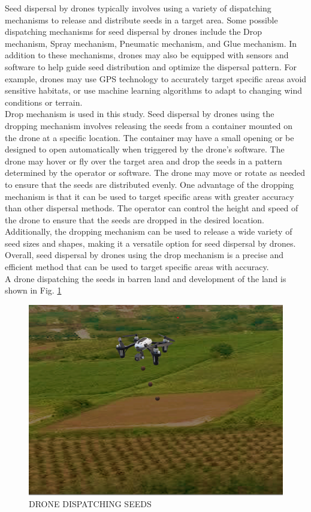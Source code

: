 \documentclass[conference]{IEEEtran}
\begin{document}
Seed dispersal by drones typically involves using a variety of dispatching mechanisms to release and distribute seeds in a target area\cite{7}. Some possible dispatching mechanisms for seed dispersal by drones include the Drop mechanism, Spray mechanism, Pneumatic mechanism, and Glue mechanism. In addition to these mechanisms, drones may also be equipped with sensors and software to help guide seed distribution and optimize the dispersal pattern. For example, drones may use GPS technology to accurately target specific areas avoid sensitive habitats, or use machine learning algorithms to adapt to changing wind conditions or terrain.
\\Drop mechanism is used in this study. Seed dispersal by drones using the dropping mechanism involves releasing the seeds from a container mounted on the drone at a specific location. The container may have a small opening or be designed to open automatically when triggered by the drone's software. The drone may hover or fly over the target area and drop the seeds in a pattern determined by the operator or software. The drone may move or rotate as needed to ensure that the seeds are distributed evenly. One advantage of the dropping mechanism is that it can be used to target specific areas with greater accuracy than other dispersal methods. The operator can control the height and speed of the drone to ensure that the seeds are dropped in the desired location. Additionally, the dropping mechanism can be used to release a wide variety of seed sizes and shapes, making it a versatile option for seed dispersal by drones. Overall, seed dispersal by drones using the drop mechanism is a precise and efficient method that can be used to target specific areas with accuracy.
\\A drone dispatching the seeds in barren land and development of the land  is shown in Fig. \ref{dis}

\begin{figure}[htp]
    \centering
    \includegraphics[scale = 0.3]{narcondam.png}
    \caption{DRONE DISPATCHING SEEDS}
    \label{dis}
\end{figure}
\end{document}
